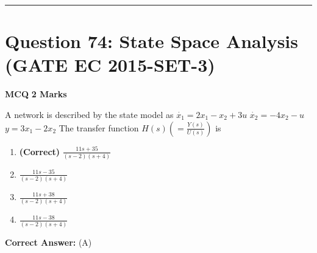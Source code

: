 \documentclass[11pt,a4paper]{article}
\begin{document}
\vspace{1.5em}
\hrule
\vspace{1.5em}

\section*{Question 74: State Space Analysis (GATE EC 2015-SET-3)}
\noindent \textbf{\color{primary}MCQ} \hfill \textbf{\color{secondary}2 Marks}


\noindent A network is described by the state model as 
$\dot{x_1}=2x_{1}-x_{2}+3u$
$\dot{x_2}=-4x_{2}-u$
$y=3x_{1}-2x_{2}$ 
 The transfer function $H(s)(=\frac{Y(s)}{U(s)})$ is


\begin{enumerate}[label=(\Alph*)]
    \item \textbf{(Correct)} $\frac{11s+35}{(s-2)(s+4)}$
    \item $\frac{11s-35}{(s-2)(s+4)}$
    \item $\frac{11s+38}{(s-2)(s+4)}$
    \item $\frac{11s-38}{(s-2)(s+4)}$
\end{enumerate}

\noindent \textbf{Correct Answer:} (A)
\end{document}
